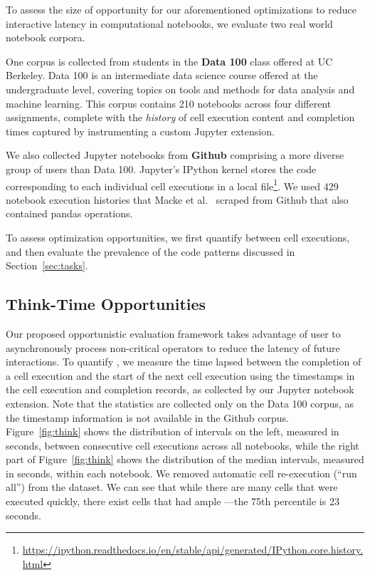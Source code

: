 To assess the size of opportunity for our aforementioned optimizations to reduce interactive latency in computational notebooks, we evaluate two real world notebook corpora.

One corpus is collected from students in the \textbf{Data 100} class offered at UC Berkeley. Data 100 is an intermediate data science course offered at the undergraduate level, covering topics on tools and methods for data analysis and machine learning.  This corpus contains 210 notebooks across four different assignments, complete with the \emph{history} of cell execution content and completion times captured by instrumenting a custom Jupyter extension.

We also collected Jupyter notebooks from \textbf{Github} comprising a more diverse group of users than Data 100.  Jupyter’s IPython kernel stores the code corresponding to each individual cell executions in a local  file\footnote{\url{https://ipython.readthedocs.io/en/stable/api/generated/IPython.core.history.html}}.  We used 429 notebook execution histories that Macke et al.~\cite{mackefine} scraped from Github that also contained pandas operations. 

To assess optimization opportunities, we first quantify \thinktime between cell executions, and then evaluate the prevalence of the code patterns discussed in Section~\ref{sec:tasks}.

\subsection{Think-Time Opportunities}
\label{sec:thinktime}
Our proposed opportunistic evaluation framework takes advantage of user \thinktime to asynchronously process non-critical operators to reduce the latency of future interactions.
To quantify \thinktime, we measure the time lapsed between the completion of a cell execution and the start of the next cell execution using the timestamps in the cell execution and completion records, as collected by our Jupyter notebook extension.
Note that the \thinktime statistics are collected only on the Data 100 corpus, as the timestamp information is not available in the Github corpus.
Figure~\ref{fig:think} shows the distribution of \thinktime intervals on the left, measured in seconds, between consecutive cell executions across all notebooks, while the right part of Figure~\ref{fig:think} shows the distribution of the median \thinktime intervals, measured in seconds, within each notebook.  
We removed automatic cell re-execution (``run all'') from the dataset.
We can see that while there are many cells that were executed quickly, there exist cells that had ample \thinktime---the 75th percentile \thinktime is 23 seconds. 

